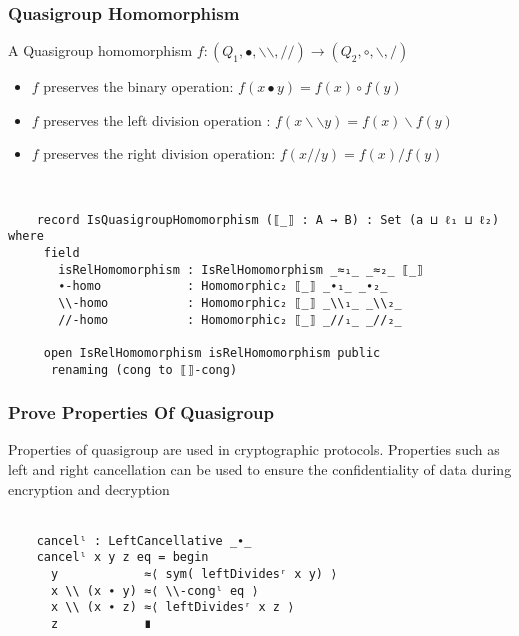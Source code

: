 \documentclass[xcolor={dvipsnames}]{beamer}
\begin{document}

\begin{frame}[fragile]
  \frametitle{Quasigroup Homomorphism}
    A Quasigroup homomorphism \( f:(Q_1,∙,\backslash \backslash,//) \rightarrow
    (Q_2,\circ,\backslash,/) \)
    \begin{itemize}
        \item $f$ preserves the binary operation: $f(x∙y) = f(x) \circ f(y)$
        \item $f$ preserves the left division operation : $f(x\backslash \backslash y) = f(x)\backslash f(y)$
        \item $f$ preserves the right division operation: $f(x//y) = f(x)/f(y)$
    \end{itemize}
\\
\begin{verbatim}
    record IsQuasigroupHomomorphism (⟦_⟧ : A → B) : Set (a ⊔ ℓ₁ ⊔ ℓ₂) where
     field
       isRelHomomorphism : IsRelHomomorphism _≈₁_ _≈₂_ ⟦_⟧
       ∙-homo            : Homomorphic₂ ⟦_⟧ _∙₁_ _∙₂_
       \\-homo           : Homomorphic₂ ⟦_⟧ _\\₁_ _\\₂_
       //-homo           : Homomorphic₂ ⟦_⟧ _//₁_ _//₂_
  
     open IsRelHomomorphism isRelHomomorphism public
      renaming (cong to ⟦⟧-cong)
\end{verbatim}
\end{frame}
  
  \begin{frame}[fragile]
    \frametitle{Prove Properties Of Quasigroup}  

      Properties of quasigroup are used in cryptographic
      protocols. Properties such as left and right cancellation can be
      used to ensure the confidentiality of data during encryption and
      decryption
      \\ \\
\begin{center}
  \centering
  \begin{verbatim}
    cancelˡ : LeftCancellative _∙_
    cancelˡ x y z eq = begin
      y            ≈⟨ sym( leftDividesʳ x y) ⟩
      x \\ (x ∙ y) ≈⟨ \\-congˡ eq ⟩
      x \\ (x ∙ z) ≈⟨ leftDividesʳ x z ⟩
      z            ∎
  \end{verbatim}
\end{center}

  \end{frame}
\end{document}
